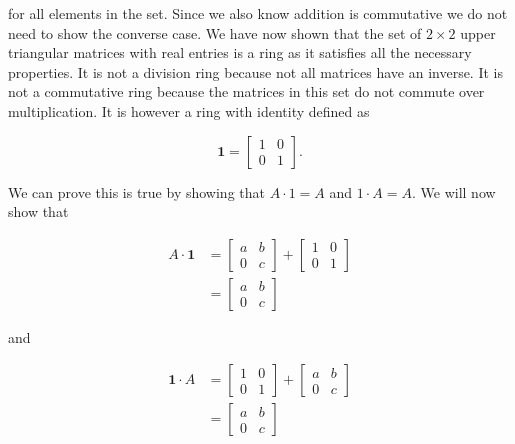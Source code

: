 \documentclass{article}
\begin{document}
    for all elements in the set. Since we also know addition is commutative we do not need to show the converse case. We have now shown that the set of $2 \times 2$ upper triangular matrices with real entries is a ring as it satisfies all the necessary properties. It is not a division ring because not all matrices have an inverse. It is not a commutative ring because the matrices in this set do not commute over multiplication. It is however a ring with identity defined as

    \[
      \textbf{1} = \begin{bmatrix}
        1 & 0\\
        0 & 1
      \end{bmatrix}.
    \]

    We can prove this is true by showing that $A \cdot 1 = A$ and $1 \cdot A = A$. We will now show that

    \begin{equation*}
      \begin{split}
        A \cdot \textbf{1} &= 
          \begin{bmatrix}
            a & b\\
            0 & c
          \end{bmatrix} +
          \begin{bmatrix}
            1 & 0\\
            0 & 1
          \end{bmatrix}\\
         &= \begin{bmatrix}
          a & b\\
          0 & c
        \end{bmatrix}
      \end{split}
    \end{equation*}

    \noindent and 

    \begin{equation*}
      \begin{split}
        \textbf{1} \cdot A&= 
          \begin{bmatrix}
            1 & 0\\
            0 & 1
          \end{bmatrix} +
          \begin{bmatrix}
            a & b\\
            0 & c
          \end{bmatrix}\\
         &= \begin{bmatrix}
          a & b\\
          0 & c
        \end{bmatrix}
      \end{split}
    \end{equation*}
\end{document}
